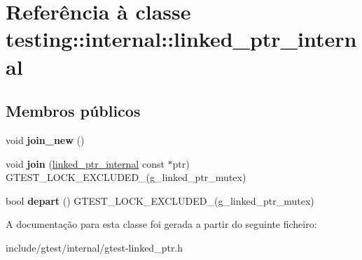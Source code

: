 \hypertarget{classtesting_1_1internal_1_1linked__ptr__internal}{\section{Referência à classe testing\-:\-:internal\-:\-:linked\-\_\-ptr\-\_\-internal}
\label{classtesting_1_1internal_1_1linked__ptr__internal}
}
\subsection*{Membros públicos}
\begin{DoxyCompactItemize}
\item 
\hypertarget{classtesting_1_1internal_1_1linked__ptr__internal_a742af1f65df2d5e2b7198a1b74264a83}{void {\bfseries join\-\_\-new} ()}\label{classtesting_1_1internal_1_1linked__ptr__internal_a742af1f65df2d5e2b7198a1b74264a83}

\item 
\hypertarget{classtesting_1_1internal_1_1linked__ptr__internal_acd5a341459f7e81b10b4112d8c764e2a}{void {\bfseries join} (\hyperlink{classtesting_1_1internal_1_1linked__ptr__internal}{linked\-\_\-ptr\-\_\-internal} const $\ast$ptr) G\-T\-E\-S\-T\-\_\-\-L\-O\-C\-K\-\_\-\-E\-X\-C\-L\-U\-D\-E\-D\-\_\-(g\-\_\-linked\-\_\-ptr\-\_\-mutex)}\label{classtesting_1_1internal_1_1linked__ptr__internal_acd5a341459f7e81b10b4112d8c764e2a}

\item 
\hypertarget{classtesting_1_1internal_1_1linked__ptr__internal_a8699e539d9702d363ef0351012d1b3ca}{bool {\bfseries depart} () G\-T\-E\-S\-T\-\_\-\-L\-O\-C\-K\-\_\-\-E\-X\-C\-L\-U\-D\-E\-D\-\_\-(g\-\_\-linked\-\_\-ptr\-\_\-mutex)}\label{classtesting_1_1internal_1_1linked__ptr__internal_a8699e539d9702d363ef0351012d1b3ca}

\end{DoxyCompactItemize}


A documentação para esta classe foi gerada a partir do seguinte ficheiro\-:\begin{DoxyCompactItemize}
\item 
include/gtest/internal/gtest-\/linked\-\_\-ptr.\-h\end{DoxyCompactItemize}
